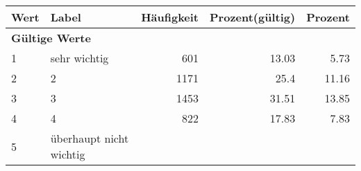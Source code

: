      \begin{longtable}{lXrrr}
     \toprule
     \textbf{Wert} & \textbf{Label} & \textbf{Häufigkeit} & \textbf{Prozent(gültig)} & \textbf{Prozent} \\
     \endhead
     \midrule
     \multicolumn{5}{l}{\textbf{Gültige Werte}}\\

     1 &
     \multicolumn{1}{X}{ sehr wichtig   } &


       \num{601} &
       \num[round-mode=places,round-precision=2]{13.03} &
         \num[round-mode=places,round-precision=2]{5.73} \\

     2 &
     \multicolumn{1}{X}{ 2   } &


       \num{1171} &
       \num[round-mode=places,round-precision=2]{25.4} &
         \num[round-mode=places,round-precision=2]{11.16} \\

     3 &
     \multicolumn{1}{X}{ 3   } &


       \num{1453} &
       \num[round-mode=places,round-precision=2]{31.51} &
         \num[round-mode=places,round-precision=2]{13.85} \\

     4 &
     \multicolumn{1}{X}{ 4   } &


       \num{822} &
       \num[round-mode=places,round-precision=2]{17.83} &
         \num[round-mode=places,round-precision=2]{7.83} \\

     5 &
     \multicolumn{1}{X}{ überhaupt nicht wichtig   } &



\end{longtable}
